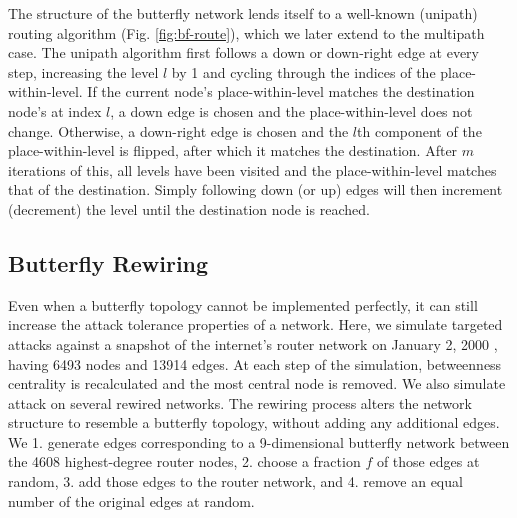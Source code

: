 \documentclass[10pt,letterpaper]{article}
\begin{document}
The structure of the butterfly network lends itself to a well-known
(unipath) routing algorithm (Fig. \ref{fig:bf-route}),
which we later extend to the multipath case.
The unipath algorithm first follows a down or down-right edge at every step,
increasing the level $l$ by 1 and cycling through the
indices of the place-within-level.
If the current node's place-within-level matches the destination node's at
index $l$,
a down edge is chosen and the place-within-level does not change.
Otherwise, a down-right edge is chosen and the $l$th component of the
place-within-level is flipped,
after which it matches the destination.
After $m$ iterations of this, all levels have been visited
and the place-within-level matches that of the destination.
Simply following down (or up) edges will then increment (decrement) the
level until the destination node is reached.

\subsection*{Butterfly Rewiring}

Even when a butterfly topology cannot be implemented perfectly,
it can still increase the attack tolerance properties of a network.
Here, we simulate targeted attacks against a snapshot of the internet's
router network on January 2, 2000
\cite{leskovec_graphs_2005}, having 6493 nodes and 13914 edges.
At each step of the simulation, betweenness centrality is recalculated and the
most central node is removed.
We also simulate attack on several rewired networks.
The rewiring process alters the network structure to resemble a butterfly
topology, without adding any additional edges.
We 1. generate edges corresponding to a 9-dimensional butterfly network between
the 4608 highest-degree router nodes,
2. choose a fraction $f$ of those edges at random,
3. add those edges to the router network, and
4. remove an equal number of the original edges at random.
\end{document}
